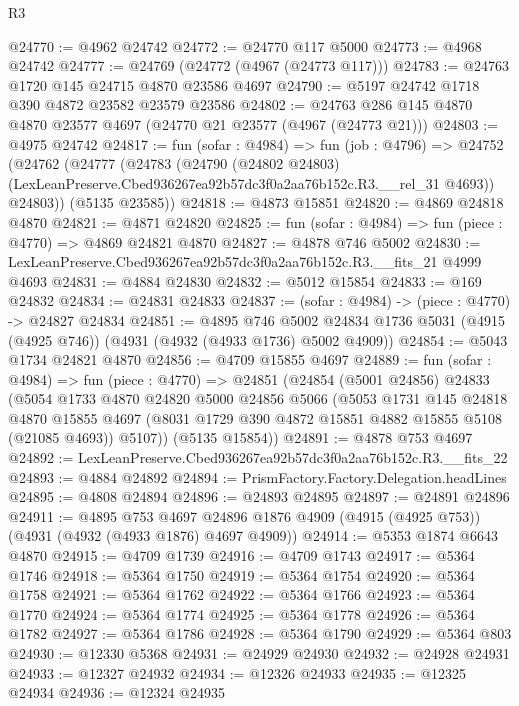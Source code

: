 \begin{lexlean}{R3}
\begin{coremodule}
@24770 := @4962 @24742
@24772 := @24770 @117 @5000
@24773 := @4968 @24742
@24777 := @24769 (@24772 (@4967 (@24773 @117)))
@24783 := @24763 @1720 @145 @24715 @4870 @23586 @4697
@24790 := @5197 @24742 @1718 @390 @4872 @23582 @23579 @23586
@24802 := @24763 @286 @145 @4870 @4870 @23577 @4697 (@24770 @21 @23577 (@4967 (@24773 @21)))
@24803 := @4975 @24742
@24817 := fun (sofar : @4984) =>
  fun (job : @4796) =>
  @24752
    (@24762
      (@24777
        (@24783
          (@24790
            (@24802 @24803)
            (LexLeanPreserve.Cbed936267ea92b57dc3f0a2aa76b152c.R3.__rel_31 @4693))
          @24803))
      (@5135 @23585))
@24818 := @4873 @15851
@24820 := @4869 @24818 @4870
@24821 := @4871 @24820
@24825 := fun (sofar : @4984) => fun (piece : @4770) => @4869 @24821 @4870
@24827 := @4878 @746 @5002
@24830 := LexLeanPreserve.Cbed936267ea92b57dc3f0a2aa76b152c.R3.__fits_21 @4999 @4693
@24831 := @4884 @24830
@24832 := @5012 @15854
@24833 := @169 @24832
@24834 := @24831 @24833
@24837 := (sofar : @4984) -> (piece : @4770) -> @24827 @24834
@24851 := @4895
    @746
    @5002
    @24834
    @1736
    @5031
    (@4915 (@4925 @746))
    (@4931 (@4932 (@4933 @1736) @5002 @4909))
@24854 := @5043 @1734 @24821 @4870
@24856 := @4709 @15855 @4697
@24889 := fun (sofar : @4984) =>
  fun (piece : @4770) =>
  @24851
    (@24854
      (@5001 @24856)
      @24833
      (@5054
        @1733
        @4870
        @24820
        @5000
        @24856
        @5066
        (@5053
          @1731
          @145
          @24818
          @4870
          @15855
          @4697
          (@8031 @1729 @390 @4872 @15851 @4882 @15855 @5108 (@21085 @4693))
          @5107))
      (@5135 @15854))
@24891 := @4878 @753 @4697
@24892 := LexLeanPreserve.Cbed936267ea92b57dc3f0a2aa76b152c.R3.__fits_22
@24893 := @4884 @24892
@24894 := PrismFactory.Factory.Delegation.headLines
@24895 := @4808 @24894
@24896 := @24893 @24895
@24897 := @24891 @24896
@24911 := @4895
    @753
    @4697
    @24896
    @1876
    @4909
    (@4915 (@4925 @753))
    (@4931 (@4932 (@4933 @1876) @4697 @4909))
@24914 := @5353 @1874 @6643 @4870
@24915 := @4709 @1739
@24916 := @4709 @1743
@24917 := @5364 @1746
@24918 := @5364 @1750
@24919 := @5364 @1754
@24920 := @5364 @1758
@24921 := @5364 @1762
@24922 := @5364 @1766
@24923 := @5364 @1770
@24924 := @5364 @1774
@24925 := @5364 @1778
@24926 := @5364 @1782
@24927 := @5364 @1786
@24928 := @5364 @1790
@24929 := @5364 @803
@24930 := @12330 @5368
@24931 := @24929 @24930
@24932 := @24928 @24931
@24933 := @12327 @24932
@24934 := @12326 @24933
@24935 := @12325 @24934
@24936 := @12324 @24935

\end{coremodule}
\end{lexlean}
